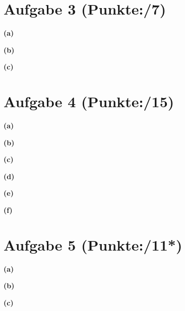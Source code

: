 \documentclass[11pt, a4paper]{article}
\newcommand{\pp}{7}
\newcommand{\ppp}{15}
\newcommand{\pppp}{11*}
\begin{document}
\section*{Aufgabe 3 (Punkte:\qquad/\pp)}
\textbf{(a)}
\begin{adjustwidth}{20pt}{20pt}

\end{adjustwidth}
\textbf{(b)}
\begin{adjustwidth}{20pt}{20pt}

\end{adjustwidth}
\textbf{(c)}
\begin{adjustwidth}{20pt}{20pt}

\end{adjustwidth}

\section*{Aufgabe 4 (Punkte:\qquad/\ppp)}
\textbf{(a)}
\begin{adjustwidth}{20pt}{20pt}

\end{adjustwidth}
\textbf{(b)}
\begin{adjustwidth}{20pt}{20pt}

\end{adjustwidth}
\textbf{(c)}
\begin{adjustwidth}{20pt}{20pt}

\end{adjustwidth}
\textbf{(d)}
\begin{adjustwidth}{20pt}{20pt}

\end{adjustwidth}
\textbf{(e)}
\begin{adjustwidth}{20pt}{20pt}

\end{adjustwidth}
\textbf{(f)}
\begin{adjustwidth}{20pt}{20pt}

\end{adjustwidth}


\section*{Aufgabe 5 (Punkte:\qquad/\pppp)}
\textbf{(a)}
\begin{adjustwidth}{20pt}{20pt}

\end{adjustwidth}
\textbf{(b)}
\begin{adjustwidth}{20pt}{20pt}

\end{adjustwidth}
\textbf{(c)}
\begin{adjustwidth}{20pt}{20pt}

\end{adjustwidth}
\end{document}
